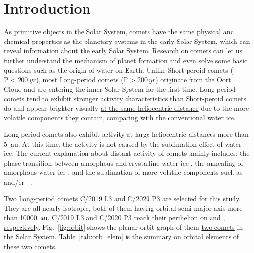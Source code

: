 \section{Introduction}

As primitive objects in the Solar System, comets have the same physical and chemical properties as the planetary systems in the early Solar System, which can reveal information about the early Solar System. Research on comets can let us further understand the mechanism of planet formation and even solve some basic questions such as the origin of water on Earth. Unlike Short-peroid comets ($\mathrm{P}<\qty{200}{yr}$), most Long-period comets ($\mathrm{P}>\qty{200}{yr}$) originate from the Oort Cloud and are entering the inner Solar System for the first time. Long-period comets tend to exhibit stronger activity characteristics than Short-peroid comets do and appear brighter visually \ul{at the same heliocentric distance} due to the more volatile components they contain, comparing with the conventional water ice. 

Long-period comets also exhibit activity at large heliocentric distances more than {\qty{5}{\astronomicalunit}}. At this time, the activity is not caused by the sublimation effect of water ice. The current explanation about distant activity of comets mainly includes: the phase transition between amorphous and crystalline water ice \citep{prialnik_crystallization_1992, capria_c1995_2002}, the annealing of amorphous water ice \citep{meech_activity_2009}, and the sublimation of more volatile components such as ~\citep{ootsubo_akari_2012} and/or ~\citep{jewitt_distant_2019}. 

Two Long-period comets C/2019 L3 and C/2020 P3 are selected for this study. They are all nearly isotropic, both of them having orbital semi-major axis more than {\SI{10000}{\astronomicalunit}}. C/2019 L3 and C/2020 P3 reach their perihelion on  and \ul{, respectively}. Fig.~\ref{fig:orbit} shows the planar orbit graph of \st{them} \ul{two comets} in the Solar System. Table~\ref{tab:orb_elem} is the summary on orbital elements of these two comets. 

